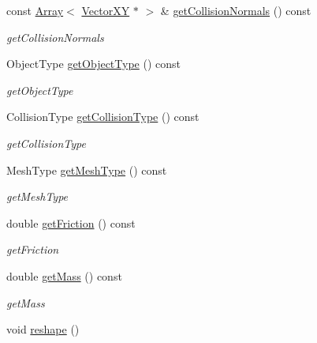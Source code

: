 \begin{DoxyCompactItemize}
const \hyperlink{classArray}{Array}$<$ \hyperlink{classVectorXY}{Vector\+X\+Y} $\ast$ $>$ \& \hyperlink{classPhysicalBody_a967028465a40efe44ba6390e3579e210}{get\+Collision\+Normals} () const 
\begin{DoxyCompactList}\small\item\em get\+Collision\+Normals \end{DoxyCompactList}\item 
Object\+Type \hyperlink{classPhysicalBody_a9371f19b3f21435c17ba01b034a01404}{get\+Object\+Type} () const 
\begin{DoxyCompactList}\small\item\em get\+Object\+Type \end{DoxyCompactList}\item 
Collision\+Type \hyperlink{classPhysicalBody_a96d5dba392884dbf83b1f82c621fac9c}{get\+Collision\+Type} () const 
\begin{DoxyCompactList}\small\item\em get\+Collision\+Type \end{DoxyCompactList}\item 
Mesh\+Type \hyperlink{classPhysicalBody_ab6ae355a3cee5918a000220af20f2837}{get\+Mesh\+Type} () const 
\begin{DoxyCompactList}\small\item\em get\+Mesh\+Type \end{DoxyCompactList}\item 
double \hyperlink{classPhysicalBody_af8733082c596676418984ab4c5398f5e}{get\+Friction} () const 
\begin{DoxyCompactList}\small\item\em get\+Friction \end{DoxyCompactList}\item 
double \hyperlink{classPhysicalBody_a8509893e9881d99ed2851338c1be6b55}{get\+Mass} () const 
\begin{DoxyCompactList}\small\item\em get\+Mass \end{DoxyCompactList}\item 
\hypertarget{classPhysicalBody_afef31c3912da9465a1caeed834db6bab}{}void \hyperlink{classPhysicalBody_afef31c3912da9465a1caeed834db6bab}{reshape} ()\label{classPhysicalBody_afef31c3912da9465a1caeed834db6bab}


\end{DoxyCompactItemize}
